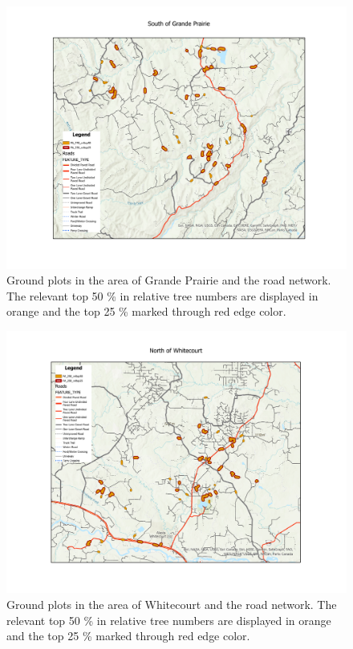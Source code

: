 \documentclass[
]{article}
\begin{document}
\begin{figure}

{\centering \includegraphics[width=0.8\linewidth]{../graphics/South-of-Grande-Prairie} 

}

\caption{Ground plots in the area of Grande Prairie and the road network. The relevant top 50 \% in relative tree numbers are displayed in orange and the top 25 \% marked through red edge color.}\label{fig:AoIGP}
\end{figure}
\begin{figure}

{\centering \includegraphics[width=0.8\linewidth]{../graphics/North-of-Whitecourt} 

}

\caption{Ground plots in the area of Whitecourt and the road network. The relevant top 50 \% in relative tree numbers are displayed in orange and the top 25 \% marked through red edge color.}\label{fig:AoIWC}
\end{figure}
\end{document}
